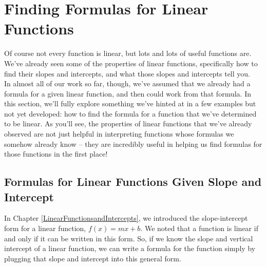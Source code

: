 
%
%

\section{Finding Formulas for Linear Functions}
\label{FormulaLinearFunctions}

Of course not every function is linear, but lots and lots of useful functions are. We’ve already seen some of the properties of linear functions, specifically how to find their slopes and intercepts, and what those slopes and intercepts tell you.\\

In almost all of our work so far, though, we’ve assumed that we already had a formula for a given linear function, and then could work from that formula. In this section, we’ll fully explore something we’ve hinted at in a few examples but not yet developed: how to find the formula for a function that we’ve determined to be linear. As you’ll see, the properties of linear functions that we’ve already observed are not just helpful in interpreting functions whose formulas we somehow already know – they are incredibly useful in helping us find formulas for those functions in the first place!

%
%

\subsection{Formulas for Linear Functions Given Slope and Intercept}

In Chapter \ref{LinearFunctionsandIntercepts}, we introduced the slope-intercept form for a linear function, $f(x)=mx+b$. We noted that a function is linear if and only if it can be written in this form. So, if we know the slope and vertical intercept of a linear function, we can write a formula for the function simply by plugging that slope and intercept into this general form.


